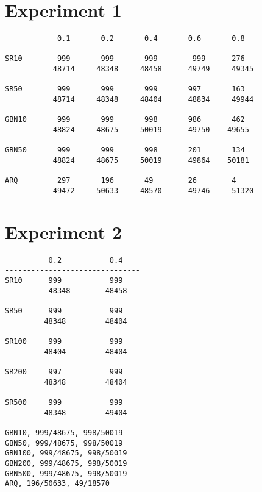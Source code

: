 \section*{Experiment 1}


\begin{verbatim}
            0.1       0.2       0.4       0.6       0.8
----------------------------------------------------------
SR10        999       999       999        999      276
           48714     48348     48458      49749     49345

SR50        999       999       999       997       163
           48714     48348     48404      48834     49944

GBN10       999       999       998       986       462
           48824     48675     50019      49750    49655

GBN50       999       999       998       201       134
           48824     48675     50019      49864    50181

ARQ         297       196       49        26        4
           49472     50633     48570      49746     51320
\end{verbatim}


\section*{Experiment 2}

\begin{verbatim}
          0.2           0.4
-------------------------------
SR10      999           999
          48348        48458     

SR50      999           999
         48348         48404

SR100     999           999
         48404         48404

SR200     997           999
         48348         48404

SR500     999           999
         48348         49404

GBN10, 999/48675, 998/50019
GBN50, 999/48675, 998/50019
GBN100, 999/48675, 998/50019
GBN200, 999/48675, 998/50019
GBN500, 999/48675, 998/50019
ARQ, 196/50633, 49/18570

\end{verbatim}
